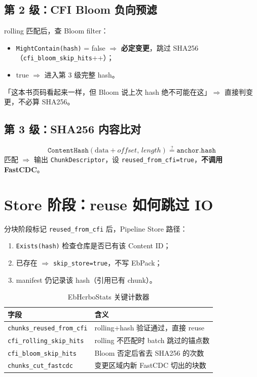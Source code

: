 \subsection{第 2 级：CFI Bloom 负向预滤}

rolling 匹配后，查 Bloom filter：
\begin{itemize}[nosep]
  \item \texttt{MightContain(hash)} = false $\Rightarrow$ \textbf{必定变更}，跳过 SHA256（\texttt{cfi\_bloom\_skip\_hits}++）；
  \item true $\Rightarrow$ 进入第 3 级完整 hash。
\end{itemize}

\begin{analogybox}[Bloom = 快速黑名单]
「这本书页码看起来一样，但 Bloom 说上次 hash 绝不可能在这」$\Rightarrow$ 直接判变更，不必算 SHA256。
\end{analogybox}

\subsection{第 3 级：SHA256 内容比对}

\[
\texttt{ContentHash}(\text{data}+offset,\,length) \stackrel{?}{=} \texttt{anchor.hash}
\]
匹配 $\Rightarrow$ 输出 \texttt{ChunkDescriptor}，设 \texttt{reused\_from\_cfi=true}，\textbf{不调用 FastCDC}。

\section{Store 阶段：reuse 如何跳过 IO}

分块阶段标记 \texttt{reused\_from\_cfi} 后，Pipeline Store 路径：
\begin{enumerate}[nosep]
  \item \texttt{Exists(hash)} 检查仓库是否已有该 Content ID；
  \item 已存在 $\Rightarrow$ \texttt{skip\_store=true}，不写 EbPack；
  \item manifest 仍记录该 hash（引用已有 chunk）。
\end{enumerate}

\begin{table}[htbp]
\centering
\caption{EbHcrboStats 关键计数器}
\label{tab:hcrbo-stats}
\small
\begin{tabular}{@{}lp{9cm}@{}}
\toprule
字段 & 含义 \\
\midrule
\texttt{chunks\_reused\_from\_cfi} & rolling+hash 验证通过，直接 reuse \\
\texttt{cfi\_rolling\_skip\_hits} & rolling 不匹配时 batch 跳过的锚点数 \\
\texttt{cfi\_bloom\_skip\_hits} & Bloom 否定后省去 SHA256 的次数 \\
\texttt{chunks\_cut\_fastcdc} & 变更区域内新 FastCDC 切出的块数 \\
\bottomrule
\end{tabular}
\end{table}

